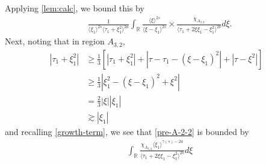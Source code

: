\documentclass[12pt,reqno]{amsart}
\numberwithin{equation}{section}  %
\numberwithin{figure}{section}
\newcommand{\rr}{\mathbb{R}}
\theoremstyle{plain}
\theoremstyle{definition}
\theoremstyle{remark}
\begin{document}
Applying \autoref{lem:calc}, we bound this by
%
%
\begin{equation}
  \label{pre-A-2-2}
\begin{split}
  &  \frac{1}{\langle \xi_{1} \rangle ^{2s}
  \langle \tau_{1} + \xi_{1}^{2}  \rangle
  ^{2a}} \int_{\rr} \frac{\langle \xi \rangle ^{2s}}{\langle
  \xi - \xi_{1}\rangle ^{2s}}  \times \frac{\chi_{A_{3,2}}}{\langle
  \tau_{1} + 2 \xi \xi_{1} - \xi_{1}^{2} \rangle ^{2b}} d \xi.
\end{split}
\end{equation}
%
Next, noting that in region $A_{3,2}$,
%
%
\begin{equation}
\begin{split}
  | \tau_{1} + \xi_{1}^{2} |
  & \ge \frac{1}{3} \left[ | \tau_{1} + \xi_{1}^{2} | + | \tau - \tau_{1} -
  (\xi - \xi_{1})^{2} | + | \tau - \xi^{2} | \right]
  \\
  & \ge \frac{1}{3} | \xi_{1}^{2} - (\xi - \xi_{1})^{2} + \xi^{2} |
  \\
  & = \frac{2}{3}| \xi | | \xi_{1} |
  \\
  & \gtrsim  | \xi_{1} |
\end{split}
\label{case-2-region-A-2-2-key-est}
\end{equation}
%
%
and recalling \eqref{growth-term}, we see that \eqref{pre-A-2-2} is bounded by
\begin{equation*}
\begin{split}
  &  \int_{\rr} \frac{\chi_{A_{3,2}} \langle \xi_{1} \rangle ^{\gamma(s) -2a}}{\langle
  \tau_{1} + 2 \xi \xi_{1} - \xi_{1}^{2} \rangle ^{2b}} d \xi
\end{split}
\end{equation*}
\end{document}

